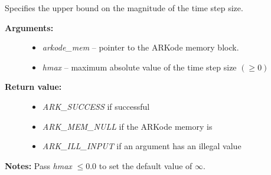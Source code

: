 \documentclass[letterpaper,10pt,english]{sphinxmanual}
\begin{document}
\begin{fulllineitems}
\label{c_interface/User_callable:c.ARKodeSetMaxStep}
Specifies the upper bound on the magnitude of the time step size.
\begin{description}
\item[{\textbf{Arguments:}}] \leavevmode\begin{itemize}
\item {} 
\emph{arkode\_mem} -- pointer to the ARKode memory block.

\item {} 
\emph{hmax} -- maximum absolute value of the time step size \((\ge 0)\)

\end{itemize}

\item[{\textbf{Return value:}}] \leavevmode\begin{itemize}
\item {} 
\emph{ARK\_SUCCESS} if successful

\item {} 
\emph{ARK\_MEM\_NULL} if the ARKode memory is 

\item {} 
\emph{ARK\_ILL\_INPUT} if an argument has an illegal value

\end{itemize}

\end{description}

\textbf{Notes:} Pass \emph{hmax} \(\le 0.0\) to set the default value of \(\infty\).

\end{fulllineitems}

\end{document}
